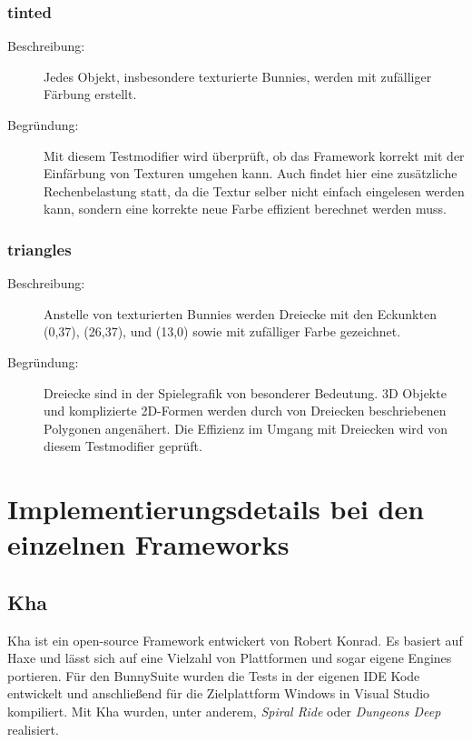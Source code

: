 \subsubsection{tinted}
\begin{description}
\item[Beschreibung:] Jedes Objekt, insbesondere texturierte Bunnies, werden mit zufälliger Färbung erstellt. \\
\item[Begründung:] Mit diesem Testmodifier wird überprüft, ob das Framework korrekt mit der Einfärbung von Texturen umgehen kann. Auch findet hier eine zusätzliche Rechenbelastung statt, da die Textur selber nicht einfach eingelesen werden kann, sondern eine korrekte neue Farbe effizient berechnet werden muss.
\end{description}

\subsubsection{triangles}
\begin{description}
\item[Beschreibung:] Anstelle von texturierten Bunnies werden Dreiecke mit den Eckunkten (0,37), (26,37), und (13,0) sowie mit zufälliger Farbe gezeichnet. \\
\item[Begründung:] Dreiecke sind in der Spielegrafik von besonderer Bedeutung. 3D Objekte und komplizierte 2D-Formen werden durch von Dreiecken beschriebenen Polygonen angenähert. Die Effizienz im Umgang mit Dreiecken wird von diesem Testmodifier geprüft.
\end{description}

\section{Implementierungsdetails bei den einzelnen Frameworks}
\subsection{Kha}
Kha ist ein open-source Framework entwickert von Robert Konrad. Es basiert auf Haxe und lässt sich auf eine Vielzahl von Plattformen und sogar eigene Engines portieren. Für den BunnySuite wurden die Tests in der eigenen IDE Kode entwickelt und anschließend für die Zielplattform Windows in Visual Studio kompiliert. Mit Kha wurden, unter anderem,  \emph{Spiral Ride} oder \emph{Dungeons Deep} realisiert.

